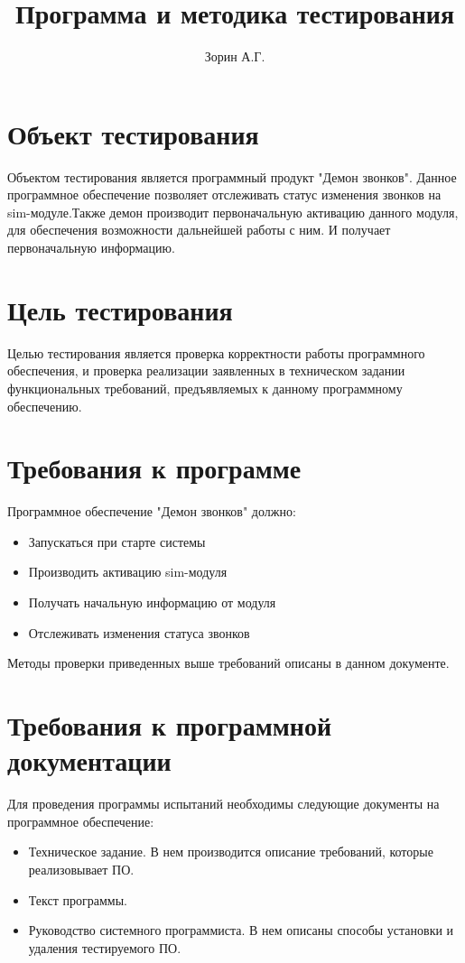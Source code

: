 \documentclass[14pt,a4paper]{report}
\author{Зорин А.Г.}
\title{Программа и методика тестирования}
\begin{document}
	\maketitle
	\renewcommand{\thesection}{\arabic{section}}
	\tableofcontents
	\pagebreak
	
\section{Объект тестирования}
Объектом тестирования является программный продукт "Демон звонков". Данное программное обеспечение позволяет отслеживать статус изменения звонков на sim-модуле.Также демон производит первоначальную активацию данного модуля, для обеспечения возможности дальнейшей работы с ним. И получает первоначальную информацию.
		
\section{Цель тестирования}
Целью тестирования является проверка корректности работы программного обеспечения, и проверка реализации заявленных в техническом задании функциональных требований, предъявляемых к данному программному обеспечению.
	
\section{Требования к программе}
Программное обеспечение "Демон звонков" должно:
\begin{itemize}
\item Запускаться при старте системы
\item Производить активацию sim-модуля
\item Получать начальную информацию от модуля
\item Отслеживать изменения статуса звонков
\end{itemize}
		
Методы проверки приведенных выше требований описаны в данном документе.
		
\section{Требования к программной документации}
Для проведения программы испытаний необходимы следующие документы на программное обеспечение:
\begin{itemize}
\item Техническое задание. В нем производится описание требований, которые реализовывает ПО.
\item Текст программы.
\item Руководство системного программиста. В нем описаны способы установки и удаления тестируемого ПО.
\end{itemize}
\end{document}
